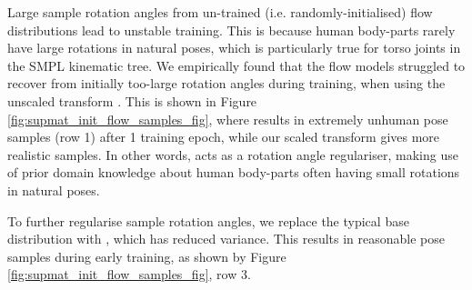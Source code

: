 Large sample rotation angles from un-trained (i.e. randomly-initialised) flow distributions lead to unstable training. This is because human body-parts rarely have large rotations in natural poses, which is particularly true for torso joints in the SMPL kinematic tree. We empirically found that the flow models struggled to recover from initially too-large rotation angles during training, when using the unscaled transform . This is shown in Figure \ref{fig:supmat_init_flow_samples_fig}, where  results in extremely unhuman pose samples (row 1) after 1 training epoch, while our scaled transform  gives more realistic samples. In other words,  acts as a rotation angle regulariser, making use of prior domain knowledge about human body-parts often having small rotations in natural poses.

To further regularise sample rotation angles, we replace the typical base distribution  with , which has reduced variance. This results in reasonable pose samples during early training, as shown by Figure \ref{fig:supmat_init_flow_samples_fig}, row 3.

